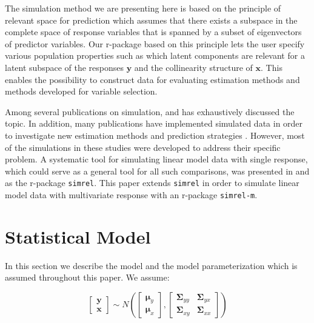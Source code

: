 \documentclass[num-refs]{wiley-article}
\begin{document}
The simulation method we are presenting here is based on the principle
of relevant space for prediction \citep{helland1994comparison}
{\color{red} which assumes that there exists a subspace in the complete
space of response variables that is spanned by a subset of eigenvectors
of predictor variables.} Our r-package based on this principle lets the
user specify various population properties such as which latent
components are relevant for a latent subspace of the responses
\(\mathbf{y}\) and the collinearity structure of \(\mathbf{x}\). This
enables the possibility to construct data for evaluating estimation
methods and methods developed for variable selection.

Among several publications on simulation, \citet{ripley2009stochastic}
and \citet{gamerman2006markov} has exhaustively discussed the topic. In
addition, many publications have implemented simulated data in order to
investigate new estimation methods and prediction strategies
\citep[see:][]{cook2015simultaneous, cook2013envelopes, helland2012near}.
However, most of the simulations in these studies were developed to
address their specific problem. A systematic tool for simulating linear
model data with single response, which could serve as a general tool for
all such comparisons, was presented in \citet{saebo2015simrel} and as
the r-package \texttt{simrel}. This paper extends \texttt{simrel} in
order to simulate linear model data with multivariate response with an
r-package \texttt{simrel-m}.

\section{Statistical Model}\label{statistical-model}

In this section we describe the model and the model parameterization
which is assumed throughout this paper. We assume:

\begin{equation}
  \begin{bmatrix}\mathbf{y}\\ \mathbf{x}\end{bmatrix} \sim N
  \left(
    \begin{bmatrix}
      \boldsymbol{\mu}_y \\
      \boldsymbol{\mu}_x
    \end{bmatrix},
    \begin{bmatrix}
      \boldsymbol{\Sigma}_{yy} & \boldsymbol{\Sigma}_{yx} \\
      \boldsymbol{\Sigma}_{xy} & \boldsymbol{\Sigma}_{xx}
    \end{bmatrix}
  \right)
  \label{eq:rand-reg-model}
\end{equation}
\end{document}
